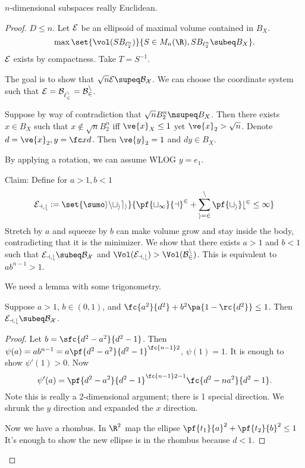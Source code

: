 $n$-dimensional subspaces really Euclidean. %
\begin{proof}
\Wog{} $D\le n$. 
Let $\cal E$ be an ellipsoid of maximal volume contained in $B_X$. 
\[
\max\set{\vol(SB_{\ell_2^n})}{S\in M_n(\R), SB_{\ell_2^n} \subeq B_X}.
\]
$\cal E$ exists by compactness. 
Take $T=S^{-1}$. 

The goal is to show that $\sqrt n \cal E\supeq B_X$. We can choose the coordinate system such that $\cal E=B_{\ell_2^n}=B_2^n$.

Suppose by way of contradiction that $\sqrt nB_2^n\nsupeq B_X$. Then there exists $x\in B_X$ such that $x\nin \sqrt{n}B_2^n$ iff $\ve{x}_X\le 1$ yet $\ve{x}_2>\sqrt n$. Denote $d=\ve{x}_2, y=\fc xd$. Then $\ve{y}_2=1$ and $dy \in B_X$. 

By applying a rotation, we can assume WLOG $y=e_1$. 

Claim: Define for $a>1,b<1$ %
\[
\cal E_{a,b} :=\set{\sumo in t_ie_i}{\pf{t_1}{a}^2 + \sum_{i=2}^n \pf{t_i}b^2 \le 1}
\]
Stretch by $a$ and squeeze by $b$ can make volume grow and stay inside the body, contradicting that it is the minimizer.
We show that there exists $a>1$ and $b<1$ such that $\cal E_{a,b}\subeq B_X$ and $\Vol(\cal E_{a,b}) > \Vol(B_2^n)$. This is equivalent to $ab^{n-1}>1$.

We need a lemma with some trigonometry.
\begin{lem}
Suppose $a>1$, $b\in (0,1)$, and $\fc{a^2}{d^2}+b^2\pa{1-\rc{d^2}} \le 1$. Then $\cal E_{a,b}\subeq B_X$.
\end{lem}
\begin{proof}
Let $b=\sfc{d^2-a^2}{d^2-1}$. Then $\psi(a)=ab^{n-1}=a\pf{d^2-a^2}{d^2-1}^{\fc{n-1}2}$, $\psi(1) = 1$. It is enough to show $\psi'(1)>0$. Now 
\[
\psi'(a) =\pf{d^2-a^2}{d^2-1}^{\fc{n-1}2-1} \fc{d^2-na^2}{d^2-1}.
\]
Note this is really a 2-dimensional argument; there is 1 special direction. We shrunk the $y$ direction and expanded the $x$ direction. 

Now we have a rhombus. %
In $\R^2$ map the ellipse $\pf{t_1}{a}^2+\pf{t_2}{b}^2\le 1$ 
It's enough to show the new ellipse is in the rhombus because $d<1$.


\end{proof}
\end{proof}
